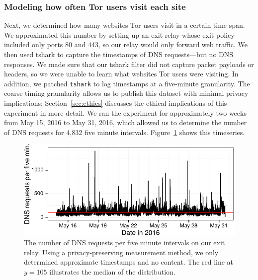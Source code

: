 \subsubsection{Modeling how often Tor users visit each site}
\label{sec:load-freq}
Next, we determined how many websites Tor users visit in a certain time span.
We approximated this number by setting up an exit relay whose exit policy
included only ports 80 and 443, so our relay would only forward web traffic.  We
then used tshark to capture the timestamps of DNS requests---but no DNS
responses.  We made sure that our tshark filter did not capture packet payloads
or headers, so we were unable to learn what websites Tor users were visiting.
In addition, we patched {\tt tshark} to log timestamps at a five-minute
granularity. The coarse timing granularity allows us to publish this
dataset with minimal privacy implications;
Section~\ref{sec:ethics} discusses the ethical implications of this
experiment in more detail.  We ran the experiment for approximately two weeks
from May 15, 2016 to May 31, 2016, which allowed us to determine the number of
DNS requests for 4,832 five minute intervals.
Figure~\ref{fig:dns-reqs} shows this timeseries.

\begin{figure}[t]
	\centering
	\includegraphics[width=\linewidth]{figures/dns-reqs.pdf}
	\caption{The number of DNS requests per five minute intervals on our
	exit relay.  Using a privacy-preserving measurement method, we only
	determined approximate timestamps and no content.  The red line at $y = 105$
	illustrates the median of the distribution.}
	\label{fig:dns-reqs}
\end{figure}

